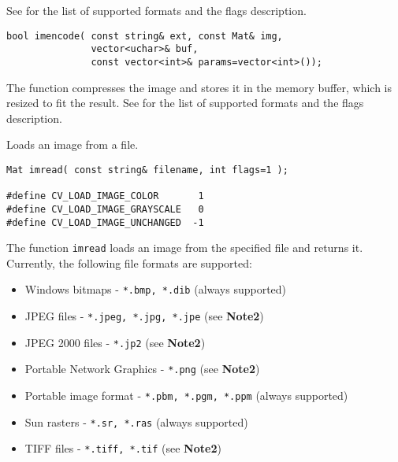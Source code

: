 See  for the list of supported formats and the flags description. 


\begin{lstlisting}
bool imencode( const string& ext, const Mat& img,
               vector<uchar>& buf,
               const vector<int>& params=vector<int>());
\end{lstlisting}
\begin{description}
\end{description}

The function compresses the image and stores it in the memory buffer, which is resized to fit the result.
See  for the list of supported formats and the flags description.


Loads an image from a file.

\begin{lstlisting}
Mat imread( const string& filename, int flags=1 );

#define CV_LOAD_IMAGE_COLOR       1
#define CV_LOAD_IMAGE_GRAYSCALE   0
#define CV_LOAD_IMAGE_UNCHANGED  -1
\end{lstlisting}

\begin{description}
\end{description}

The function \texttt{imread} loads an image from the specified file and returns it. Currently, the following file formats are supported:
\begin{itemize}
\item Windows bitmaps - \texttt{*.bmp, *.dib} (always supported)
\item JPEG files - \texttt{*.jpeg, *.jpg, *.jpe} (see \textbf{Note2})
\item JPEG 2000 files - \texttt{*.jp2} (see \textbf{Note2})
\item Portable Network Graphics - \texttt{*.png}  (see \textbf{Note2})
\item Portable image format - \texttt{*.pbm, *.pgm, *.ppm} (always supported)
\item Sun rasters - \texttt{*.sr, *.ras} (always supported)
\item TIFF files - \texttt{*.tiff, *.tif}  (see \textbf{Note2})
\end{itemize}

